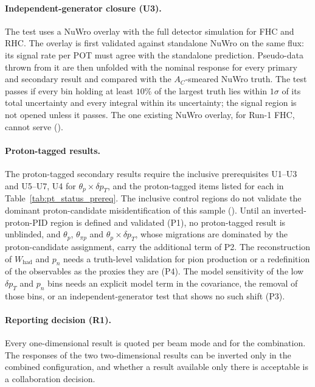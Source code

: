 \paragraph{Independent-generator closure (U3).} The test uses a NuWro overlay with the full detector
simulation for FHC and RHC. The overlay is first validated against standalone NuWro on the same flux: its
signal rate per POT must agree with the standalone prediction. Pseudo-data thrown from it are then
unfolded with the nominal response for every primary and secondary result and compared with the
$A_C$-smeared NuWro truth. The test passes if every bin holding at least $10\%$ of the largest truth lies
within $1\sigma$ of its total uncertainty and every integral within its uncertainty; the signal region is
not opened unless it passes. The one existing NuWro overlay, for Run-1 FHC, cannot serve
().

\paragraph{Proton-tagged results.} The proton-tagged secondary results require the inclusive
prerequisites U1--U3 and U5--U7, U4 for $\theta_p\times\delta p_T$, and the proton-tagged items listed
for each in Table~\ref{tab:pt_status_prereq}. The inclusive control regions do not validate the dominant
proton-candidate misidentification of this sample (). Until an
inverted-proton-PID region is defined and validated (P1), no proton-tagged result is unblinded, and
$\theta_p$, $\theta_{\pi p}$ and $\theta_p\times\delta p_T$, whose migrations are dominated by the
proton-candidate assignment, carry the additional term of P2. The reconstruction of $W_\mathrm{had}$ and
$p_n$ needs a truth-level validation for pion production or a redefinition of the observables as the
proxies they are (P4). The model sensitivity of the low $\delta p_T$ and $p_n$ bins needs an explicit
model term in the covariance, the removal of those bins, or an independent-generator test that shows no
such shift (P3).

\paragraph{Reporting decision (R1).} Every one-dimensional result is quoted per beam mode and for the
combination. The responses of the two two-dimensional results can be inverted only in the combined
configuration, and whether a result available only there is acceptable is a collaboration decision.

